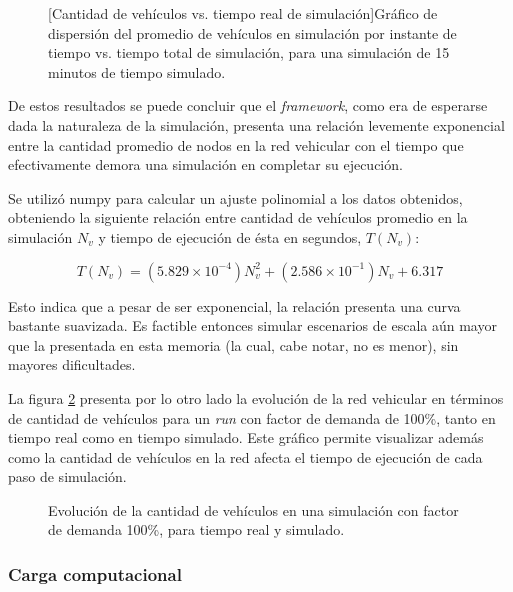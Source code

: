 \begin{figure}[htpb]
    \centering    
    
    [Cantidad de vehículos vs. tiempo real de simulación]{Gráfico de dispersión del promedio de vehículos en simulación por instante de tiempo vs. tiempo total de simulación, para una simulación de 15 minutos de tiempo simulado.}
    \label{fig:vehiclesvstime}
\end{figure}

De estos resultados se puede concluir que el \emph{framework}, como era de esperarse dada la naturaleza de la simulación, presenta una relación levemente exponencial entre la cantidad promedio de nodos en la red vehicular con el tiempo que efectivamente demora una simulación en completar su ejecución.

Se utilizó numpy para calcular un ajuste polinomial a los datos obtenidos, obteniendo la siguiente relación entre cantidad de vehículos promedio en la simulación $N_{v}$ y tiempo de ejecución de ésta en segundos, $T(N_{v})$:

\[ T(N_{v}) = (5.829 \times 10^{-4})N_{v}^{2} + (2.586 \times 10^{-1})N_{v} + 6.317 \]

Esto indica que a pesar de ser exponencial, la relación presenta una curva bastante suavizada. Es factible entonces simular escenarios de escala aún mayor que la presentada en esta memoria (la cual, cabe notar, no es menor), sin mayores dificultades.

La figura \ref{fig:timevsvehicles_evolution} presenta por lo otro lado la evolución de la red vehicular en términos de cantidad de vehículos para un \emph{run} con factor de demanda de 100\%, tanto en tiempo real como en tiempo simulado. Este gráfico permite visualizar además como la cantidad de vehículos en la red afecta el tiempo de ejecución de cada paso de simulación.

\begin{figure}[htpb]
    \centering
    
    \caption[Evolución temporal de la cantidad de vehículos en la simulación.]{Evolución de la cantidad de vehículos en una simulación con factor de demanda 100\%, para tiempo real y simulado.}
    \label{fig:timevsvehicles_evolution}
\end{figure}

\subsubsection{Carga computacional}

